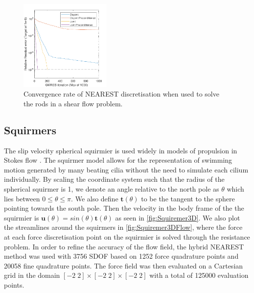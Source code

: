 \begin{figure}
    \centering
    \includegraphics[width=0.4\textwidth]{Images/Rods/NearestPrecon.pdf}
    \caption{Convergence rate of NEAREST discretisation when used to solve the rods in a shear flow problem.}
    \label{fig:NearestConverge}
\end{figure}

\subsection{Squirmers}
The slip velocity spherical squirmier is used widely in models of propulsion in Stokes flow \cite{Smith2021TheSelf-Propulsion,Lauga2020TheModel,Pedley2016SquirmersSwimming}. The squirmer model allows for the representation of swimming motion generated by many beating cilia without the need to simulate each cilium individually. By scaling the coordinate system such that the radius of the spherical squirmer is 1, we denote an angle relative to the north pole as $\theta$ which lies between $0\leq\theta\leq\pi$. We also define $\bm{t}(\theta)$ to be the tangent to the sphere pointing towards the south pole. Then the velocity in the body frame of the the squirmier is $\bm{u}(\theta) = sin(\theta)\bm{t}(\theta)$ as seen in \cref{fig:Squiremer3D}. We also plot the streamlines around the squirmers in \cref{fig:Squiremer3DFlow}, where the force at each force discretisation point on the squirmier is solved through the resistance problem. In order to refine the accuracy of the flow field, the hybrid NEAREST method was used with 3756 SDOF based on 1252 force quadrature points and 20058 fine quadrature points. The force field was then evaluated on a Cartesian grid in the domain $[-2\; 2] \times [-2\; 2] \times [-2\; 2]$ with a total of 125000 evaluation points. 


